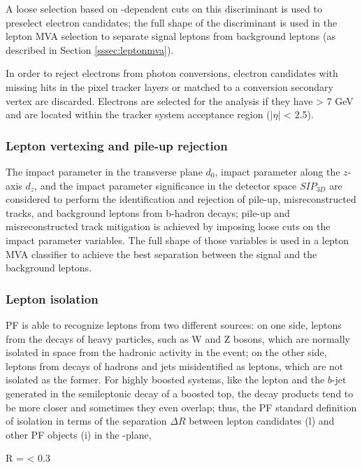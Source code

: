 A loose selection based on \etac-dependent cuts on this discriminant is used to preselect electron candidates; the full shape of the discriminant is used in the lepton MVA selection to separate signal leptons from background leptons (as described in Section \ref{sssec:leptonmva}).

In order to reject electrons from photon conversions, electron candidates with missing hits in the pixel tracker layers or matched to a conversion secondary vertex are discarded. Electrons are selected for the analysis if they have \pt > 7 GeV and are located within the tracker system acceptance region ($|\eta|$ < 2.5). %

\subsubsection*{Lepton vertexing and pile-up rejection}

The impact parameter in the transverse plane $d_0$, impact parameter along the $z$-axis $d_z$, and the impact parameter significance in the detector space $SIP_{3D}$ are considered to perform the identification and rejection of pile-up, misreconstructed tracks, and background leptons from b-hadron decays; pile-up and misreconstructed track mitigation is achieved by imposing loose cuts on the impact parameter variables. The full shape of those variables is used in a lepton MVA classifier to achieve the best separation between the signal and the background leptons.

\subsubsection*{Lepton isolation}

PF is able to recognize leptons from two different sources: on one side, leptons from the decays of heavy particles, such as W and Z bosons, which are normally isolated in space from the hadronic activity in the event; on the other side, leptons from decays of hadrons and jets misidentified as leptons, which are not isolated as the former. For highly boosted systems, like the lepton and the $b$-jet generated in the semileptonic decay of a boosted top, the decay products tend to be more closer and sometimes they even overlap; thus, the PF standard definition of isolation in terms of the separation $\Delta R$ between lepton candidates (l) and other PF objects (i) in the \etac-\phic plane,

\beqn
\Delta R = < 0.3
\eeqn

